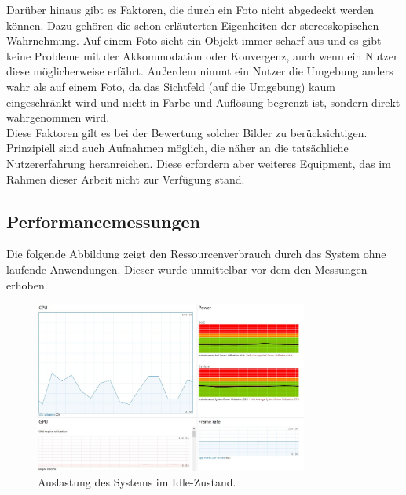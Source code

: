 Darüber hinaus gibt es Faktoren, die durch ein Foto nicht abgedeckt werden können. Dazu gehören die schon erläuterten Eigenheiten der stereoskopischen Wahrnehmung. Auf einem Foto sieht ein Objekt immer scharf aus und es gibt keine Probleme mit der Akkommodation oder Konvergenz, auch wenn ein Nutzer diese möglicherweise erfährt. Außerdem nimmt ein Nutzer die Umgebung anders wahr als auf einem Foto, da das Sichtfeld (auf die Umgebung) kaum eingeschränkt wird und nicht in Farbe und Auflösung begrenzt ist, sondern direkt wahrgenommen wird.\\

Diese Faktoren gilt es bei der Bewertung solcher Bilder zu berücksichtigen. Prinzipiell sind auch Aufnahmen möglich, die näher an die tatsächliche Nutzererfahrung heranreichen. Diese erfordern aber weiteres Equipment, das im Rahmen dieser Arbeit nicht zur Verfügung stand.

\subsection{Performancemessungen}
Die folgende Abbildung zeigt den Ressourcenverbrauch durch das System ohne laufende Anwendungen. Dieser wurde unmittelbar vor dem den Messungen erhoben.
\begin{figure}[h!]
	\centering
	\includegraphics[width=0.8\textwidth]{images/performance/idle.jpg}
	\caption{Auslastung des Systems im Idle-Zustand.}
	\label{img:idle}
\end{figure}
